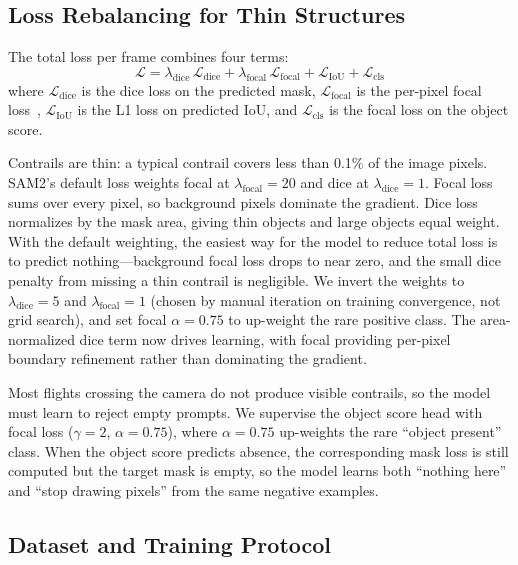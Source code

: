 \documentclass[review]{elsarticle}
\begin{document}
\subsection{Loss Rebalancing for Thin Structures}

The total loss per frame combines four terms:
\begin{equation}
    \mathcal{L} = \lambda_\text{dice}\,\mathcal{L}_\text{dice} + \lambda_\text{focal}\,\mathcal{L}_\text{focal} + \mathcal{L}_\text{IoU} + \mathcal{L}_\text{cls}
\label{eq:loss}
\end{equation}
where $\mathcal{L}_\text{dice}$ is the dice loss on the predicted mask, $\mathcal{L}_\text{focal}$ is the per-pixel focal loss~\cite{lin2017focal}, $\mathcal{L}_\text{IoU}$ is the L1 loss on predicted IoU, and $\mathcal{L}_\text{cls}$ is the focal loss on the object score.

Contrails are thin: a typical contrail covers less than 0.1\% of the image pixels. SAM2's default loss weights focal at $\lambda_\text{focal}=20$ and dice at $\lambda_\text{dice}=1$. Focal loss sums over every pixel, so background pixels dominate the gradient. Dice loss normalizes by the mask area, giving thin objects and large objects equal weight. With the default weighting, the easiest way for the model to reduce total loss is to predict nothing---background focal loss drops to near zero, and the small dice penalty from missing a thin contrail is negligible. We invert the weights to $\lambda_\text{dice}=5$ and $\lambda_\text{focal}=1$ (chosen by manual iteration on training convergence, not grid search), and set focal $\alpha=0.75$ to up-weight the rare positive class. The area-normalized dice term now drives learning, with focal providing per-pixel boundary refinement rather than dominating the gradient.

Most flights crossing the camera do not produce visible contrails, so the model must learn to reject empty prompts. We supervise the object score head with focal loss ($\gamma=2$, $\alpha=0.75$), where $\alpha=0.75$ up-weights the rare ``object present'' class. When the object score predicts absence, the corresponding mask loss is still computed but the target mask is empty, so the model learns both ``nothing here'' and ``stop drawing pixels'' from the same negative examples.

\subsection{Dataset and Training Protocol}
\label{sec:dataset}
\end{document}
